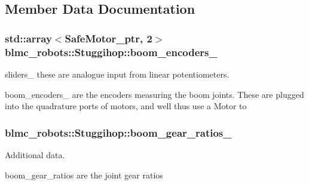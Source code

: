 \subsection{Member Data Documentation}
\subsubsection[{\texorpdfstring{boom\+\_\+encoders\+\_\+}{boom_encoders_}}]{\setlength{\rightskip}{0pt plus 5cm}std\+::array$<${\bf Safe\+Motor\+\_\+ptr}, 2$>$ blmc\+\_\+robots\+::\+Stuggihop\+::boom\+\_\+encoders\+\_\+\hspace{0.3cm}{\ttfamily [private]}}\hypertarget{classblmc__robots_1_1Stuggihop_a5c96c061e050c6b89175ea64ca718fcb}{}\label{classblmc__robots_1_1Stuggihop_a5c96c061e050c6b89175ea64ca718fcb}


sliders\+\_\+ these are analogue input from linear potentiometers. 

boom\+\_\+encoders\+\_\+ are the encoders measuring the boom joints. These are plugged into the quadrature ports of motors, and we\textquotesingle{}ll thus use a Motor to 
\subsubsection[{\texorpdfstring{boom\+\_\+gear\+\_\+ratios\+\_\+}{boom_gear_ratios_}}]{ blmc\+\_\+robots\+::\+Stuggihop\+::boom\+\_\+gear\+\_\+ratios\+\_\+\hspace{0.3cm}{\ttfamily [private]}}\hypertarget{classblmc__robots_1_1Stuggihop_a84f6ffe6ea3058bb908a4915e040e936}{}\label{classblmc__robots_1_1Stuggihop_a84f6ffe6ea3058bb908a4915e040e936}


Additional data. 

boom\+\_\+gear\+\_\+ratios are the joint gear ratios 
